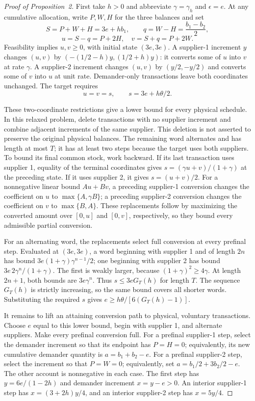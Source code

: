 \documentclass[ecta,draft,supplement]{econsocart}
\theoremstyle{definition}
\theoremstyle{definition}
\begin{document}
\begin{appendix}
\begin{proof}[Proof of Proposition~2%
]
First take $h>0$ and abbreviate $\gamma=\gamma_h$ and
$\epsilon=e$. At any cumulative allocation, write $P,W,H$ for the
three balances and set
\[
 S=P+W+H=3e+hb_1,\qquad
 q=W-H=\frac{b_1-b_2}{2},
\]
\[
 u=S-q=P+2H,\quad v=S+q=P+2W.
\]
Feasibility implies $u,v\geq0$, with initial state $(3e,3e)$.
A supplier-1 increment $y$ changes $(u,v)$ by
$(-(1/2-h)y,(1/2+h)y)$: it converts some of $u$ into $v$ at rate
$\gamma$. A supplier-2 increment changes $(u,v)$ by
$(y/2,-y/2)$ and converts some of $v$ into $u$ at unit rate.
Demander-only transactions leave both coordinates unchanged. The target
requires
\[
 u=v=s,\qquad s=3e+h\theta/2.
\]

These two-coordinate restrictions give a lower bound for every physical
schedule. In this relaxed problem, delete transactions with no supplier
increment and combine adjacent increments of the same supplier. This
deletion is not asserted to preserve the original physical balances.
The remaining word alternates and has length at most $T$; it has at least
two steps because the target uses both suppliers. To bound its final
common stock, work backward.
If its last transaction uses supplier 1, equality of the terminal
coordinates gives $s=(\gamma u+v)/(1+\gamma)$ at the preceding state.
If it uses supplier 2, it gives $s=(u+v)/2$. For a nonnegative linear
bound $A u+B v$, a preceding supplier-1 conversion changes the coefficient
on $u$ to $\max\{A,\gamma B\}$; a preceding supplier-2 conversion
changes the coefficient on $v$ to $\max\{B,A\}$. These replacements
follow by maximizing the converted amount over $[0,u]$ and $[0,v]$,
respectively, so they bound every admissible partial conversion.

For an alternating word, the replacements select full conversion at every
prefinal step. Evaluated at $(3e,3e)$, a word beginning with supplier 1
and of length $2n$ has bound
$3e(1+\gamma)\gamma^{n-1}/2$; one beginning with supplier 2 has
bound $3e\,2\gamma^n/(1+\gamma)$. The first is weakly larger,
because $(1+\gamma)^2\geq4\gamma$. At length $2n+1$, both bounds
are $3e\gamma^n$. Thus $s\leq3eG_T(h)$ for length $T$.
The sequence $G_T(h)$ is strictly increasing, so the same bound covers
all shorter words. Substituting the required $s$ gives
$e\geq h\theta/[6(G_T(h)-1)]$.

It remains to lift an attaining conversion path to physical, voluntary
transactions. Choose $e$ equal to this lower bound, begin with supplier 1,
and alternate suppliers. Make every prefinal conversion full. For a
prefinal supplier-1 step, select the demander increment so that its endpoint
has $P=H=0$; equivalently, its new cumulative demander quantity is
$a=b_1+b_2-e$. For a prefinal supplier-2 step, select the increment so
that $P=W=0$; equivalently, set $a=b_1/2+3b_2/2-e$.
The other account is nonnegative in each case. The first step has
$y=6e/(1-2h)$ and demander increment $x=y-e>0$.
An interior supplier-1 step has $x=(3+2h)y/4$, and an interior
supplier-2 step has $x=5y/4$.


\end{proof}
\end{appendix}
\end{document}
